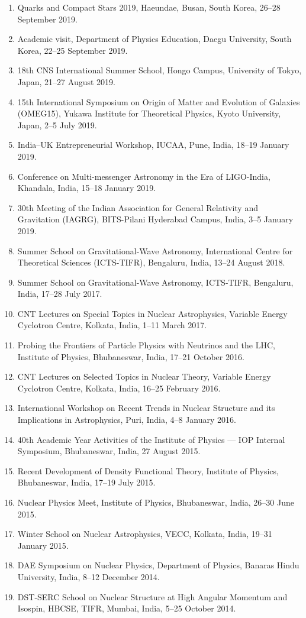 
\begin{enumerate}
\item Quarks and Compact Stars 2019, Haeundae, Busan, South Korea,
26--28 September 2019.
\item Academic visit, Department of Physics Education, Daegu University,
South Korea, 22--25 September 2019.
\item 18th CNS International Summer School, Hongo Campus, University of Tokyo,
Japan, 21--27 August 2019.
\item 15th International Symposium on Origin of Matter and Evolution of Galaxies
(OMEG15), Yukawa Institute for Theoretical Physics, Kyoto University, Japan,
2--5 July 2019.
\item India--UK Entrepreneurial Workshop, IUCAA, Pune, India,
18--19 January 2019.
\item Conference on Multi-messenger Astronomy in the Era of LIGO-India,
Khandala, India, 15--18 January 2019.
\item 30th Meeting of the Indian Association for General Relativity and
Gravitation (IAGRG), BITS-Pilani Hyderabad Campus, India, 3--5 January 2019.
\item Summer School on Gravitational-Wave Astronomy, International Centre for
Theoretical Sciences (ICTS-TIFR), Bengaluru, India, 13--24 August 2018.
\item Summer School on Gravitational-Wave Astronomy, ICTS-TIFR, Bengaluru,
India, 17--28 July 2017.
\item CNT Lectures on Special Topics in Nuclear Astrophysics, Variable Energy
Cyclotron Centre, Kolkata, India, 1--11 March 2017.
\item Probing the Frontiers of Particle Physics with Neutrinos and the LHC,
Institute of Physics, Bhubaneswar, India, 17--21 October 2016.
\item CNT Lectures on Selected Topics in Nuclear Theory, Variable Energy
Cyclotron Centre, Kolkata, India, 16--25 February 2016.
\item International Workshop on Recent Trends in Nuclear Structure and its
Implications in Astrophysics, Puri, India, 4--8 January 2016.
\item 40th Academic Year Activities of the Institute of Physics --- IOP Internal
Symposium, Bhubaneswar, India, 27 August 2015.
\item Recent Development of Density Functional Theory, Institute of Physics,
Bhubaneswar, India, 17--19 July 2015.
\item Nuclear Physics Meet, Institute of Physics, Bhubaneswar, India,
26--30 June 2015.
\item Winter School on Nuclear Astrophysics, VECC, Kolkata, India,
19--31 January 2015.
\item DAE Symposium on Nuclear Physics, Department of Physics, Banaras Hindu
University, India, 8--12 December 2014.
\item DST-SERC School on Nuclear Structure at High Angular Momentum and Isospin,
HBCSE, TIFR, Mumbai, India, 5--25 October 2014.
\end{enumerate}
